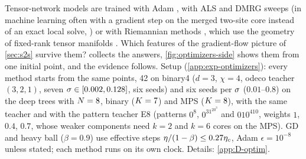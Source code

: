 Tensor-network models are trained with Adam \citep{kingma2015adam}, with ALS and DMRG sweeps
\citep{white1992density,holtz2012alternating} (in machine learning often with a gradient step on the merged two-site
core instead of an exact local solve, \citealp{stoudenmire2016supervised}) or with Riemannian methods
\citep{novikov2018exponential,steinlechner2016riemannian}, which use the geometry of fixed-rank tensor manifolds
\citep{holtz2012manifolds,uschmajew2013geometry}. Which features of the gradient-flow picture of \cref{sec:s2s}
survive them?  collects the answers, \cref{fig:optimizers-side} shows them from one initial
point, and the evidence follows. Setup (\cref{app:exp-optimizers}): every method starts from the same points, 42 on
binary4 ($d=3$, $\chi=4$, odeco teacher $(3,2,1)$, seven $\sigma\in[0.002,0.128]$, six seeds) and six seeds per $\sigma$
($0.01$--$0.8$) on the deep trees with $N=8$, binary ($K=7$) and MPS ($K=8$), with the same teacher and with the
pattern teacher E8 (patterns $0^8$, $0^31^20^3$ and $010^410$, weights $1$, $0.4$, $0.7$, whose weaker components need
$k=2$ and $k=6$ cores on the MPS). GD and heavy ball ($\beta=0.9$) use effective steps $\eta/(1-\beta)\le0.27\eta_c$,
Adam $\epsilon=10^{-8}$ unless stated; each method runs on its own clock. Details: \cref{app:D-optim}.

